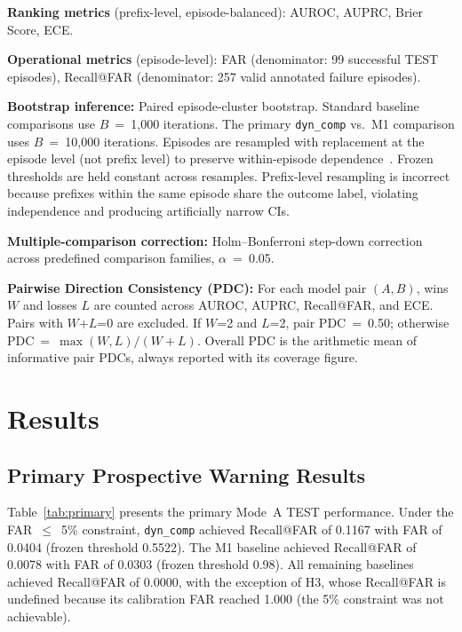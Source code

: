 \documentclass[conference,letterpaper]{IEEEtran}
\begin{document}
\textbf{Ranking metrics} (prefix-level, episode-balanced): AUROC, AUPRC,
Brier Score, ECE.

\textbf{Operational metrics} (episode-level): FAR (denominator: 99
successful TEST episodes), Recall@FAR (denominator: 257 valid annotated
failure episodes).

\textbf{Bootstrap inference:} Paired episode-cluster bootstrap. Standard
baseline comparisons use $B$~=~1{,}000 iterations. The primary
\texttt{dyn\_comp} vs.\ M1 comparison uses $B$~=~10{,}000 iterations.
Episodes are resampled with replacement at the episode level (not prefix
level) to preserve within-episode dependence~\cite{b12}. Frozen
thresholds are held constant across resamples. Prefix-level resampling
is incorrect because prefixes within the same episode share the outcome
label, violating independence and producing artificially narrow CIs.

\textbf{Multiple-comparison correction:} Holm--Bonferroni step-down
correction~\cite{b13} across predefined comparison families,
$\alpha$~=~0.05.

\textbf{Pairwise Direction Consistency (PDC):} For each model pair
$(A,B)$, wins $W$ and losses $L$ are counted across AUROC, AUPRC,
Recall@FAR, and ECE. Pairs with $W$+$L$=0 are excluded. If $W$=2 and
$L$=2, pair PDC~=~0.50; otherwise PDC~=~$\max(W,L)/(W+L)$. Overall PDC
is the arithmetic mean of informative pair PDCs, always reported with
its coverage figure.

\section{Results}

\subsection{Primary Prospective Warning Results}

Table~\ref{tab:primary} presents the primary Mode~A TEST performance.
Under the FAR~$\leq$~5\% constraint, \texttt{dyn\_comp} achieved
Recall@FAR of 0.1167 with FAR of 0.0404 (frozen threshold 0.5522).
The M1 baseline achieved Recall@FAR of 0.0078 with FAR of
0.0303 (frozen threshold 0.98). All remaining baselines achieved
Recall@FAR of 0.0000, with the exception of H3, whose Recall@FAR is
undefined because its calibration FAR reached 1.000 (the 5\% constraint
was not achievable).
\end{document}

